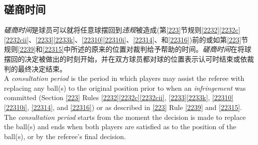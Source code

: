\subsection{磋商时间}

\noindent \textit{磋商时间}是球员可以就将任意球摆回到\textit{违规}被造成(第\ref{223}节规则\ref{2232}\ref{2232c}\ref{2232cii}、\ref{2233}\ref{2233k}、\ref{22310}\ref{22310i}、\ref{22314}、和\ref{22316})前的或如第\ref{223}节规则\ref{2239}和\ref{22315}中所述的原来的位置对裁判给予帮助的时间。\textit{磋商时间}在将球摆回的决定被做出的时刻开始，并在双方球员都对球的位置表示认可时结束或依裁判的最终决定结束。\\
A \textit{consultation period} is the period in which players may assist the referee with replacing any ball(s) to the original position prior to when an \textit{infringement} was committed (Section \ref{223} Rules \ref{2232}\ref{2232c}\ref{2232cii}, \ref{2233}\ref{2233k}, \ref{22310}\ref{22310i}, \ref{22314}, and \ref{22316}) or as described in \ref{223} Rule \ref{2239} and \ref{22315}. The \textit{consultation period} starts from the moment the decision is made to replace the ball(s) and ends when both players are satisfied as to the position of the ball(s), or by the referee's final decision.
